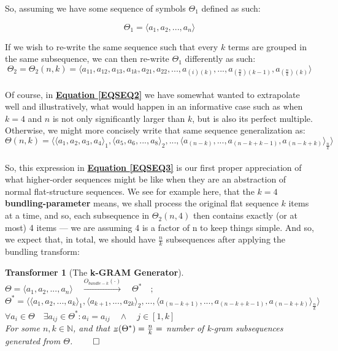 \documentclass[a4paper, 18pt]{book} %
\newtheorem{transf}{Transformer}
\newcommand{\invpi}{\rotatebox[origin=c]{180}{$\pi$}}
\begin{document}
So, assuming we have some sequence of symbols $\Theta_1$ defined as such:

\begin{equation}
\label{EQSEQ1}
\Theta_1 = \langle a_1, a_2,...,a_n\rangle
\end{equation}

If we wish to re-write the same sequence such that every $k$ terms are grouped in the same subsequence, we can then re-write $\Theta_1$ differently as such:\\


\begin{equation}
\label{EQSEQ2}
\Theta_2 = \Theta_2(n,k) = \langle a_{11}, a_{12}, a_{13}, a_{1k}, a_{21}, a_{22},...,a_{(i)(k)},...,a_{(\frac{n}{k})(k-1)},a_{(\frac{n}{k})(k)}\rangle
\end{equation}\\

Of course, in \textbf{\hyperref[EQSEQ2]{Equation \ref{EQSEQ2}}} we have somewhat wanted to extrapolate well and illustratively, what would happen in an informative case such as when $k = 4$ and $n$ is not only significantly larger than $k$, but is also its perfect multiple. Otherwise, we might more concisely write that same sequence generalization as:\\


\begin{equation}
\label{EQSEQ3}
\Theta(n,k) = \langle \langle a_1, a_2, a_3, a_4 \rangle_1, \langle a_5, a_6,...,a_8 \rangle_2,... , \langle a_{(n-k)},...,a_{(n-k+k-1)},a_{(n-k+k)}\rangle_{\frac{n}{k}} \rangle
\end{equation}\\

So, this expression in \textbf{\hyperref[EQSEQ3]{Equation \ref{EQSEQ3}}} is our first proper appreciation of what higher-order sequences might be like when they are an abstraction of normal flat-structure sequences. We see for example here, that the $k=4$ \textbf{bundling-parameter} means, we shall process the original flat sequence $k$ items at a time, and so, each subsequence in $\Theta_2(n,4)$ then contains exactly (or at most) 4 items --- we are assuming 4 is a factor of n to keep things simple. And so, we expect that, in total, we should have $\frac{n}{k}$ subsequences after applying the bundling transform:\\

\begin{transf}[The \textbf{k-GRAM Generator}]
\label{TRANSFBUND}
$\Theta = \langle a_1, a_2,...,a_n\rangle \quad \xrightarrow{O_{bundle-k}(\cdot)} \quad \Theta^* \quad;$\\
$\Theta^* = \langle \langle a_1, a_2,..., a_k \rangle_1, \langle a_{k+1},...,a_{2k} \rangle_2,... , \langle a_{(n-k+1)},...,a_{(n-k+k-1)},a_{(n-k+k)}\rangle_{\frac{n}{k}} \rangle$\\
$\forall a_i \in \Theta \quad \exists a_{ij} \in \Theta^*: a_i = a_{ij} \quad \land \quad j \in [1,k]$\\
For some $n, k \in \mathbb{N}$, and that $\invpi(\Theta^*) = \frac{n}{k} = $ number of k-gram subsequences generated from $\Theta$. $\qed$\\
\end{transf}
\end{document}

